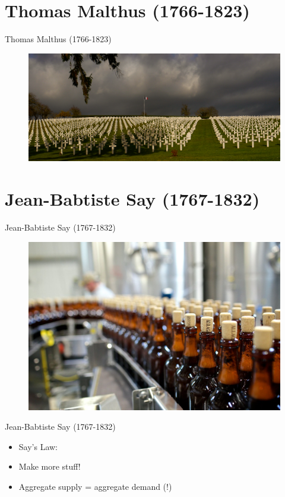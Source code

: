\documentclass{beamer}
\begin{document}
\section{Thomas Malthus (1766-1823)}
\begin{frame}{Thomas Malthus (1766-1823)}
      \begin{figure}
        \includegraphics[width=\textwidth, keepaspectratio]{../img/malthus.jpg}
    \end{figure}  
\end{frame}{}

\section{Jean-Babtiste Say (1767-1832)}

\begin{frame}{Jean-Babtiste Say (1767-1832)}
\begin{figure}[htpb]
	\centering
	\includegraphics[width=1\linewidth]{../img/beer.jpg}
	\label{fig:beer}
\end{figure}
\end{frame}

\begin{frame}{Jean-Babtiste Say (1767-1832)}
    \begin{itemize}[<+- | alert@+>]
    \item Say's Law:
    \item Make more stuff!
    \item Aggregate supply = aggregate demand (!)
    \end{itemize}    
\end{frame}{}
\end{document}
